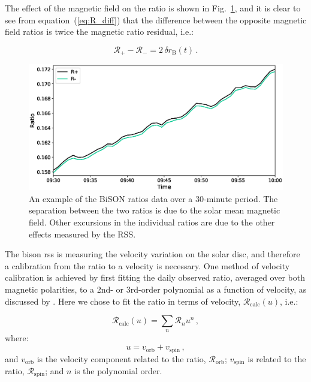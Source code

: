 The effect of the magnetic field on the ratio is shown in Fig.~\ref{fig:ratio_split}, and it is clear to see from equation~(\ref{eq:R_diff}) that the difference between the opposite magnetic field ratios is twice the magnetic ratio residual, i.e.:

\begin{equation}
\mathcal{R}_{+} - \mathcal{R}_{-} = 2 \, \delta {r}_{\mathrm{B}}(t) \, .
\label{eq:R_diff}
\end{equation}

\begin{figure}[ht!]
	\includegraphics[width=\columnwidth]{Fred_ratio_zoom.eps}
	\caption{An example of the BiSON ratios data over a 30-minute period. The separation between the two ratios is due to the solar mean magnetic field. Other excursions in the individual ratios are due to the other effects measured by the RSS.}
	\label{fig:ratio_split}
\end{figure}

The \gls{bison} \gls{rss} is measuring the velocity variation on the solar disc, and therefore a calibration from the ratio to a velocity is necessary. One method of velocity calibration is achieved by first fitting the daily observed ratio, averaged over both magnetic polarities, to a 2nd- or 3rd-order polynomial as a function of velocity, as discussed by \citet{elsworth_techniques_1995}. Here we chose to fit the ratio in terms of velocity, $\mathcal{R}_{\mathrm{calc}}(u)$, i.e.:

\begin{equation}
\mathcal{R}_{\mathrm{calc}}(u) = \sum_{n} \mathcal{R}_{n} u^n \, ,
\label{eq:calc_ratio}
\end{equation}
%
where:
%
\begin{equation}
u = v_{\mathrm{orb}} + v_{\mathrm{spin}} \, ,
\label{eq:stn_vel}
\end{equation}
%
and $v_{\mathrm{orb}}$ is the velocity component related to the ratio,  $\mathcal{R}_{\mathrm{orb}}$; $v_{\mathrm{spin}}$ is related to the ratio, $\mathcal{R}_{\mathrm{spin}}$; and $n$ is the polynomial order.

